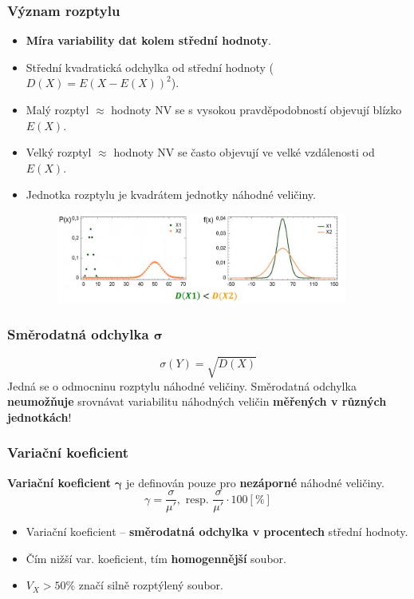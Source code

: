 \subsubsection{Význam rozptylu}
\begin{itemize}
	\item \textbf{Míra variability dat kolem střední hodnoty}.
	\item Střední kvadratická odchylka od střední hodnoty ($D(X) = E(X - E(X))^2$).
	\item Malý rozptyl $\approx$ hodnoty NV se s vysokou pravděpodobností objevují blízko $E(X)$.
	\item Velký rozptyl $\approx$ hodnoty NV se často objevují ve velké vzdálenosti od $E(X)$.
	\item Jednotka rozptylu je kvadrátem jednotky náhodné veličiny.
	\begin{figure}[H]
			\centering
			\includegraphics[width=0.9\textwidth]{assets/11_rozptyl}
	\end{figure}
\end{itemize}

\subsubsection{Směrodatná odchylka $\mathbf{\sigma}$}
$$\sigma(Y) = \sqrt{D(X)}$$
Jedná se o odmocninu rozptylu náhodné veličiny. Směrodatná odchylka \textbf{neumožňuje} srovnávat variabilitu náhodných veličin \textbf{měřených v různých jednotkách}! 

\subsubsection{Variační koeficient}
\textbf{Variační koeficient} $\mathbf{\gamma}$ je definován pouze pro \textbf{nezáporné} náhodné veličiny. $$\gamma = \frac{\sigma}{\mu'}, \textrm{ resp. } \frac{\sigma}{\mu'} \cdot 100 [\%]$$
\begin{itemize}
	\item Variační koeficient -- \textbf{směrodatná odchylka v procentech} střední hodnoty.
	\item Čím nižší var. koeficient, tím \textbf{homogennější} soubor.
	\item $V_X > 50\%$ značí silně rozptýlený soubor.
\end{itemize}